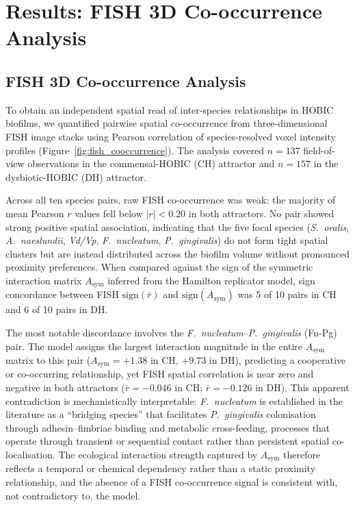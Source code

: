 \section*{Results: FISH 3D Co-occurrence Analysis}
\subsection{FISH 3D Co-occurrence Analysis}
\label{sec:fish_cooccurrence}

To obtain an independent spatial read of inter-species relationships in
HOBIC biofilms, we quantified pairwise spatial co-occurrence from
three-dimensional FISH image stacks using Pearson correlation of
species-resolved voxel intensity profiles (Figure~\ref{fig:fish_cooccurrence}).
The analysis covered $n = 137$ field-of-view observations in the commensal-HOBIC
(CH) attractor and $n = 157$ in the dysbiotic-HOBIC (DH) attractor.

Across all ten species pairs, raw FISH co-occurrence was weak: the majority
of mean Pearson $r$ values fell below $|r| < 0.20$ in both attractors.
No pair showed strong positive spatial association, indicating that the
five focal species (\textit{S.~oralis}, \textit{A.~naeslundii},
\textit{Vd/Vp}, \textit{F.~nucleatum}, \textit{P.~gingivalis}) do not
form tight spatial clusters but are instead distributed across the biofilm
volume without pronounced proximity preferences.
When compared against the sign of the symmetric interaction matrix
$A_\mathrm{sym}$ inferred from the Hamilton replicator model,
sign concordance between FISH $\mathrm{sign}(\bar{r})$ and
$\mathrm{sign}(A_\mathrm{sym})$ was 5 of 10 pairs in CH and 6 of 10 pairs
in DH.

The most notable discordance involves the \textit{F.~nucleatum}--\textit{P.~gingivalis}
(Fn-Pg) pair.  The model assigns the largest interaction magnitude in the
entire $A_\mathrm{sym}$ matrix to this pair ($A_\mathrm{sym} = +1.38$ in CH,
$+9.73$ in DH), predicting a cooperative or co-occurring relationship,
yet FISH spatial correlation is near zero and negative in both attractors
($\bar{r} = -0.046$ in CH; $\bar{r} = -0.126$ in DH).
This apparent contradiction is mechanistically interpretable: \textit{F.~nucleatum}
is established in the literature as a ``bridging species'' that facilitates
\textit{P.~gingivalis} colonisation through adhesin--fimbriae binding and
metabolic cross-feeding, processes that operate through transient or
sequential contact rather than persistent spatial co-localisation.
The ecological interaction strength captured by $A_\mathrm{sym}$ therefore
reflects a temporal or chemical dependency rather than a static proximity
relationship, and the absence of a FISH co-occurrence signal is consistent
with, not contradictory to, the model.

